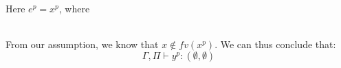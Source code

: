 \item[\runa{T-Var}] Here $e^p=x^p$, where
\begin{figure}[H]
	\setlength\tabcolsep{8pt}
	\begin{tabular}{l}
		
	\end{tabular}
\end{figure}
From our assumption, we know that $x\notin fv(x^p)$.
We can thus conclude that:
$$\Gamma,\Pi\vdash y^p : (\emptyset,\emptyset)$$
